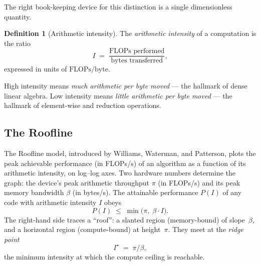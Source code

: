 \documentclass[11pt,a4paper]{article}
\theoremstyle{definition}
\newtheorem{definition}{Definition}[section]
\theoremstyle{remark}
\theoremstyle{plain}
\begin{document}
The right book-keeping device for this distinction is a single
dimensionless quantity.

\begin{definition}[Arithmetic intensity]
The \emph{arithmetic intensity} of a computation is the ratio
\begin{equation}
    I \;=\; \frac{\text{FLOPs performed}}{\text{bytes transferred}},
\label{eq:ai}
\end{equation}
expressed in units of $\mathrm{FLOPs}/\mathrm{byte}$.
\end{definition}

High intensity means \emph{much arithmetic per byte moved} --- the
hallmark of dense linear algebra. Low intensity means \emph{little
arithmetic per byte moved} --- the hallmark of element-wise and
reduction operations.

\subsection{The Roofline}

The Roofline model, introduced by Williams, Waterman, and
Patterson, plots the peak achievable performance (in FLOPs/s) of
an algorithm as a function of its arithmetic intensity, on
log--log axes. Two hardware numbers determine the graph: the
device's peak arithmetic throughput $\pi$ (in FLOPs/s) and its peak
memory bandwidth $\beta$ (in bytes/s). The attainable performance
$P(I)$ of any code with arithmetic intensity $I$ obeys
\begin{equation}
    P(I) \;\leq\; \min\bigl(\pi,\; \beta \cdot I\bigr).
\label{eq:roofline}
\end{equation}
The right-hand side traces a ``roof'': a slanted region (memory-bound)
of slope~$\beta$, and a horizontal region (compute-bound) at
height~$\pi$. They meet at the \emph{ridge point}
\begin{equation}
    I^{\star} \;=\; \pi / \beta,
\end{equation}
the minimum intensity at which the compute ceiling is reachable.
\end{document}

